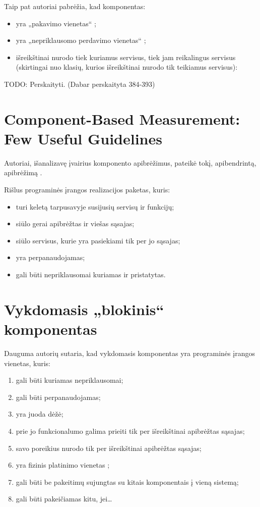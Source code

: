 Taip pat autoriai pabrėžia, kad komponentas:
\begin{itemize}
  \item yra „pakavimo vienetas“ %
    \cite[387]{objects-components-and-frameworks-with-uml};
  \item yra „nepriklausomo perdavimo vienetas“ \cite[387]{objects-components-and-frameworks-with-uml};
  \item išreikštinai nurodo tiek kuriamus servisus, tiek jam
    reikalingus servisus (skirtingai nuo klasių, kurios išreikštinai
    nurodo tik teikiamus servisus):
\end{itemize}

TODO: Perskaityti. (Dabar perskaityta 384-393)

\section{Component-Based Measurement: Few Useful Guidelines}

Autoriai, išanalizavę įvairius komponento apibrėžimus, pateikė tokį,
apibendrintą, apibrėžimą \cite[2]{Gill:2003:CMF:966221.966237}.
\begin{defn}[Komponentas]
  Rišlus programinės įrangos realizacijos paketas, kuris:
  \begin{itemize}
    \item turi keletą tarpusavyje susijusių servisų ir funkcijų;
    \item siūlo gerai apibrėžtas ir viešas sąsajas;
    \item siūlo servisus, kurie yra pasiekiami tik per jo sąsajas;
    \item yra perpanaudojamas;
    \item gali būti nepriklausomai kuriamas ir pristatytas.
  \end{itemize}
\end{defn}

\section{Vykdomasis „blokinis“ komponentas}

Dauguma autorių sutaria, kad vykdomasis komponentas yra programinės
įrangos vienetas, kuris:
\begin{enumerate}
  \item gali būti kuriamas nepriklausomai;
  \item gali būti perpanaudojamas;
  \item yra juoda dėžė;
  \item prie jo funkcionalumo galima prieiti tik per išreikštinai
    apibrėžtas sąsajas;
  \item savo poreikius nurodo tik per išreikštinai apibrėžtas sąsajas;
  \item yra fizinis platinimo vienetas ;
  \item gali būti be pakeitimų sujungtas su kitais komponentais į
    vieną sistemą;
  \item gali būti pakeičiamas kitu, jei…
\end{enumerate}

